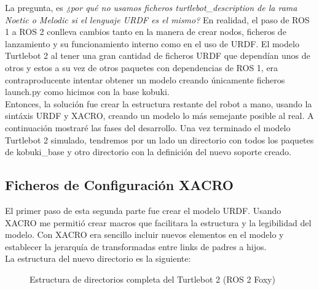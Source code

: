 La pregunta, es \textit{¿por qué no usamos ficheros turtlebot\_description de la rama Noetic o Melodic si el lenguaje URDF es el mismo?} En realidad, el paso de ROS 1 a ROS 2 conlleva cambios tanto en la manera de crear nodos, ficheros de lanzamiento y su funcionamiento interno como en el uso de URDF. El modelo Turtlebot 2 al tener una gran cantidad de ficheros URDF que dependían unos de otros y estos a su vez de otros paquetes con dependencias de ROS 1, era contraproducente intentar obtener un modelo creando únicamente ficheros launch.py como hicimos con la base kobuki.\\

Entonces, la solución fue crear la estructura restante del robot a mano, usando la sintáxis URDF y XACRO, creando un modelo lo más semejante posible al real. A continuación mostraré las fases del desarrollo. Una vez terminado el modelo Turtlebot 2 simulado, tendremos por un lado un directorio con todos los paquetes de kobuki\_base y otro directorio con la definición del nuevo soporte creado.



\subsection{Ficheros de Configuración XACRO}
\label{sec:turtlebot2_xacro}

El primer paso de esta segunda parte fue crear el modelo URDF. Usando XACRO me permitió crear macros que facilitara la estructura y la legibilidad del modelo. Con XACRO era sencillo incluir nuevos elementos en el modelo y establecer la jerarquía de transformadas entre links de padres a hijos.\\

La estructura del nuevo directorio es la siguiente:
\begin{figure}[H]
	\begin{center}
	    \setlength{\fboxsep}{0.5cm}
	    \caption{Estructura de directorios completa del Turtlebot 2 (ROS 2 Foxy)}
	    \label{fig.directorios_turtlebot2}
	\end{center}
\end{figure}

